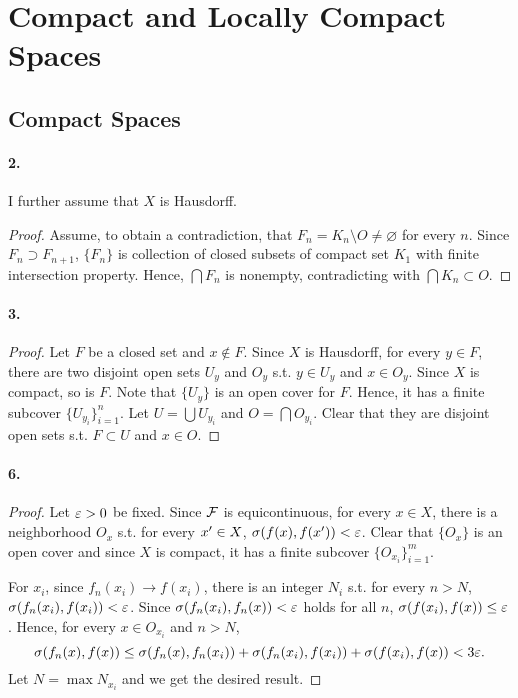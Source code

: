 \section{Compact and Locally Compact Spaces}
\subsection{Compact Spaces}

\paragraph{2.}
  I further assume that $X$ is Hausdorff. 
\begin{proof}
  Assume, to obtain a contradiction, that $F_n = K_n\setminus O \ne\varnothing$
  for every $n$. Since $F_n \supset F_{n+1}$, $\{F_n\}$ is collection of closed
  subsets of compact set $K_1$ with finite intersection property. Hence, 
  $\bigcap F_n$ is nonempty, contradicting with $\bigcap K_n \subset O$. 
\end{proof}

\paragraph{3.}
\begin{proof}
  Let $F$ be a closed set and $x \notin F$. Since $X$ is Hausdorff, for every
  $y \in F$, there are two disjoint open sets $U_y$ and $O_y$ s.t. $y \in U_y$
  and $x \in O_y$. Since $X$ is compact, so is $F$. Note that $\{U_y\}$ is an
  open cover for $F$. Hence, it has a finite subcover $\{U_{y_i}\}_{i=1}^n$.
  Let $U = \bigcup U_{y_i}$ and $O = \bigcap O_{y_i}$. Clear that they are
  disjoint open sets s.t. $F \subset U$ and $x \in O$.
\end{proof}

\paragraph{6.}
\begin{proof}
  Let $\varepsilon > 0$ be fixed. Since $\mathcal{F}$ is equicontinuous, for every 
  $x \in X$, there is a neighborhood $O_x$ s.t. for every $x^\prime \in X$,
  $\sigma(f(x), f(x^\prime)) < \varepsilon$. Clear that $\{O_x\}$ is an open cover and
  since $X$ is compact, it has a finite subcover $\{O_{x_i}\}_{i=1}^m$. 
  
  For $x_i$, since $f_n(x_i) \to f(x_i)$, there is an integer $N_i$ s.t. for  
  every $n > N$, $\sigma(f_n(x_i), f(x_i)) < \varepsilon$. Since $\sigma(f_n(x_i), 
  f_n(x)) < \varepsilon$ holds for all $n$, $\sigma(f(x_i), f(x)) \le \varepsilon$.
  Hence, for every $x \in O_{x_i}$ and $n > N$,
  \[
    \sigma(f_n(x), f(x))
    \le \sigma(f_n(x), f_n(x_i)) + \sigma(f_n(x_i), f(x_i)) 
      + \sigma(f(x_i), f(x))
    < 3\varepsilon.
  \]
  Let $N = \max N_{x_i}$ and we get the desired result.
\end{proof}
